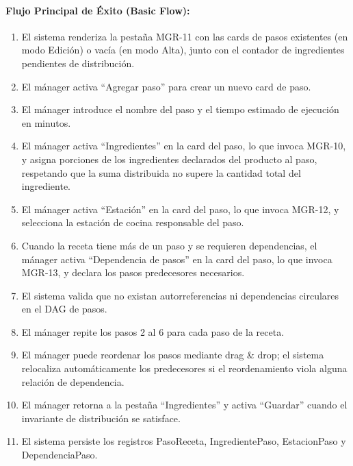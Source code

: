 \paragraph{Flujo Principal de Éxito (Basic Flow):}
\begin{enumerate}
    \item[I.] El sistema renderiza la pestaña MGR-11 con las cards de pasos existentes (en modo Edición) o vacía (en modo Alta), junto con el contador de ingredientes pendientes de distribución.
    \item[II.] El mánager activa ``Agregar paso'' para crear un nuevo card de paso.
    \item[III.] El mánager introduce el nombre del paso y el tiempo estimado de ejecución en minutos.
    \item[IV.] El mánager activa ``Ingredientes'' en la card del paso, lo que invoca MGR-10, y asigna porciones de los ingredientes declarados del producto al paso, respetando que la suma distribuida no supere la cantidad total del ingrediente.
    \item[V.] El mánager activa ``Estación'' en la card del paso, lo que invoca MGR-12, y selecciona la estación de cocina responsable del paso.
    \item[VI.] Cuando la receta tiene más de un paso y se requieren dependencias, el mánager activa ``Dependencia de pasos'' en la card del paso, lo que invoca MGR-13, y declara los pasos predecesores necesarios.
    \item[VII.] El sistema valida que no existan autorreferencias ni dependencias circulares en el DAG de pasos.
    \item[VIII.] El mánager repite los pasos 2 al 6 para cada paso de la receta.
    \item[IX.] El mánager puede reordenar los pasos mediante drag \& drop; el sistema relocaliza automáticamente los predecesores si el reordenamiento viola alguna relación de dependencia.
    \item[X.] El mánager retorna a la pestaña ``Ingredientes'' y activa ``Guardar'' cuando el invariante de distribución se satisface.
    \item[XI.] El sistema persiste los registros PasoReceta, IngredientePaso, EstacionPaso y DependenciaPaso.
\end{enumerate}

